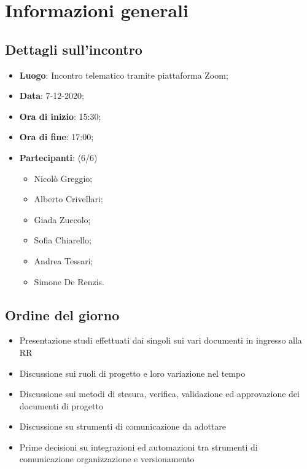 \section{Informazioni generali}

\subsection{Dettagli sull'incontro}
\begin{itemize}
\item \textbf{Luogo}: Incontro telematico tramite piattaforma Zoom;
\item \textbf{Data}: 7-12-2020;
\item \textbf{Ora di inizio}: 15:30;
\item \textbf{Ora di fine}: 17:00;
\item \textbf{Partecipanti}: (6/6)
\begin{itemize}
	\item Nicolò Greggio;
	\item Alberto Crivellari;
	\item Giada Zuccolo;
	\item Sofia Chiarello;
	\item Andrea Tessari;
	\item Simone De Renzis.
\end{itemize}
\end{itemize}

\subsection{Ordine del giorno}
\begin{itemize}
	\item Presentazione studi effettuati dai singoli sui vari documenti in ingresso alla RR
    \item Discussione sui ruoli di progetto e loro variazione nel tempo
    \item Discussione sui metodi di stesura, verifica, validazione ed approvazione dei documenti di progetto
    \item Discussione su strumenti di comunicazione da adottare
    \item Prime decisioni su integrazioni ed automazioni tra strumenti di comunicazione organizzazione e versionamento
\end{itemize}



